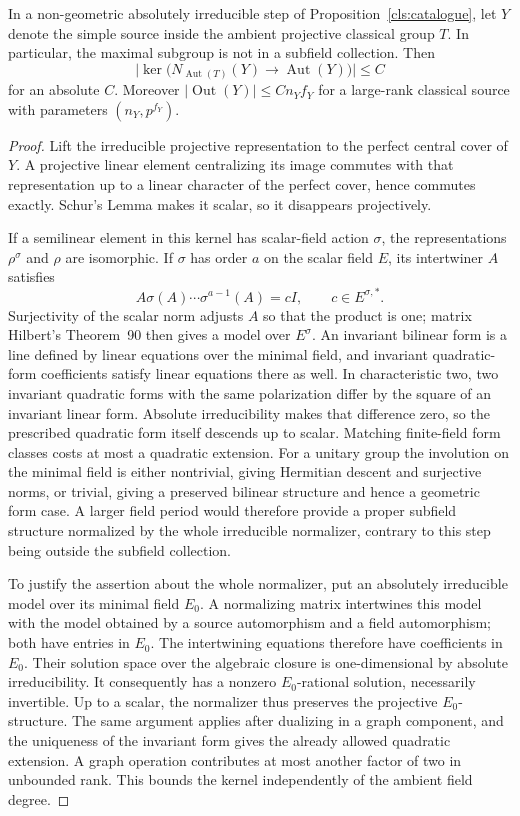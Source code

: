 \begin{lemma}\label{cls:normalizer}
In a non-geometric absolutely irreducible step of
Proposition~\ref{cls:catalogue}, let $Y$ denote the simple source
inside the ambient projective classical group $T$.  In particular,
the maximal subgroup is not in a subfield collection.  Then
\[
 \bigl|\ker\bigl(N_{\operatorname{Aut}(T)}(Y)
       \longrightarrow\operatorname{Aut}(Y)\bigr)\bigr|\leq C
\]
for an absolute $C$.  Moreover
$|\operatorname{Out}(Y)|\leq C n_Y f_Y$ for a large-rank classical
source with parameters $(n_Y,p^{f_Y})$.
\end{lemma}
\begin{proof}
Lift the irreducible projective representation to the perfect central
cover of $Y$.  A projective linear element centralizing its image
commutes with that representation up to a linear character of the
perfect cover, hence commutes exactly.  Schur's Lemma makes it scalar,
so it disappears projectively.

If a semilinear element in this kernel has scalar-field action $\sigma$,
the representations $\rho^\sigma$ and $\rho$ are isomorphic.  If
$\sigma$ has order $a$ on the scalar field $E$, its intertwiner $A$
satisfies
\[
 A\sigma(A)\cdots\sigma^{a-1}(A)=cI,
 \qquad c\in E^{\sigma,*}.
\]
Surjectivity of the scalar norm adjusts $A$ so that the product is
one; matrix Hilbert's Theorem~90 then gives a model over $E^\sigma$.
An invariant bilinear form is a line defined by linear equations
over the minimal field, and invariant quadratic-form coefficients
satisfy linear equations there as well.  In characteristic two,
two invariant quadratic forms with the same polarization differ
by the square of an invariant linear form.  Absolute irreducibility
makes that difference zero, so the prescribed quadratic form itself
descends up to scalar.  Matching finite-field form classes costs at
most a quadratic extension.  For a unitary group the involution on
the minimal field is either nontrivial, giving Hermitian descent
and surjective norms, or trivial, giving a preserved bilinear
structure and hence a geometric form case.  A larger field period would
therefore provide a proper subfield structure normalized by the
whole irreducible normalizer, contrary to this step being outside the
subfield collection.

To justify the assertion about the whole
normalizer, put an absolutely irreducible model over its minimal
field $E_0$.  A normalizing matrix intertwines this model with the
model obtained by a source automorphism and a field automorphism;
both have entries in $E_0$.  The intertwining equations therefore
have coefficients in $E_0$.  Their solution space over the algebraic
closure is one-dimensional by absolute irreducibility.  It consequently
has a nonzero $E_0$-rational solution, necessarily invertible.  Up to a
scalar, the normalizer thus preserves the projective $E_0$-structure.
The same argument applies after dualizing in a graph component, and
the uniqueness of the invariant form gives the already allowed
quadratic extension.  A graph operation contributes at most another
factor of two in unbounded rank.  This bounds the kernel independently
of the ambient field degree.


\end{proof}

